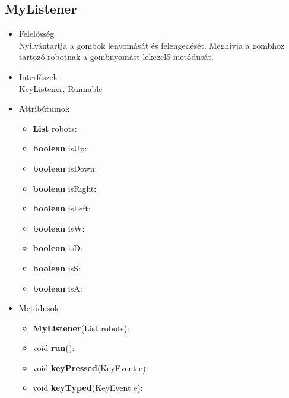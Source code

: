 \subsection{MyListener}
\begin{itemize}
\item Felelősség\\
Nyilvántartja a gombok lenyomását és felengedését. Meghívja a gombhoz tartozó robotnak a gombnyomást lekezelő metódusát.
\item Interfészek\\
KeyListener, Runnable
\item Attribútumok\\
	\begin{itemize}
	    \item \textbf{List} robots: 
		\item \textbf{boolean} isUp: 
		\item \textbf{boolean} isDown: 
		\item \textbf{boolean} isRight: 
		\item \textbf{boolean} isLeft: 
		\item \textbf{boolean} isW: 
		\item \textbf{boolean} isD: 
		\item \textbf{boolean} isS: 
		\item \textbf{boolean} isA: 
	\end{itemize}
\item Metódusok\\
	\begin{itemize}
		\item \textbf{MyListener}(List robots): 
		\item void \textbf{run}():  
		\item void \textbf{keyPressed}(KeyEvent e): 
		\item void \textbf{keyTyped}(KeyEvent e): 
	\end{itemize}
\end{itemize}


